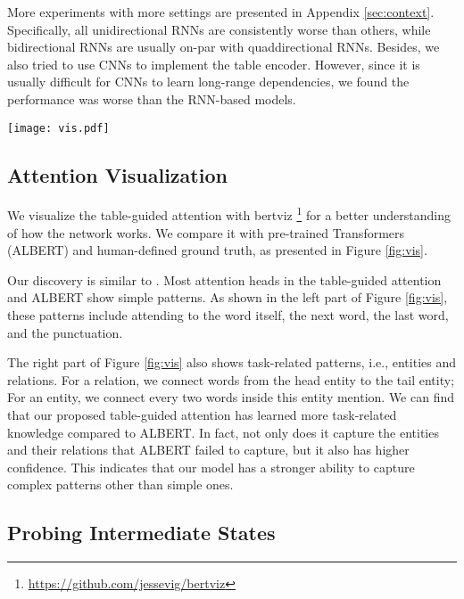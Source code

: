\documentclass[11pt,a4paper]{article}
\begin{document}
More experiments with more settings are presented in Appendix \ref{sec:context}.
Specifically, all unidirectional RNNs are consistently worse than others,
while bidirectional RNNs are usually on-par with quaddirectional RNNs.
Besides, we also tried to use CNNs to implement the table encoder.
However, since it is usually difficult for CNNs to learn long-range dependencies, we found the performance was worse than the RNN-based models.

\begin{figure*}
    \centering
    \texttt{[image: vis.pdf]}
    \caption{
        Comparison between ground truth and selected heads of ALBERT and table-guided attention.
        The sentence is randomly selected from the development set of ACE05.
    }
    \label{fig:vis}
\end{figure*}


\subsection{Attention Visualization} \label{sec:vis}

We visualize the table-guided attention with bertviz \cite{bertviz}\footnote{\url{https://github.com/jessevig/bertviz}} for a better understanding of how the network works.
We compare it with pre-trained Transformers (ALBERT) and human-defined ground truth, as presented in Figure \ref{fig:vis}.

Our discovery is similar to \citet{clark2019does}.
Most attention heads in the table-guided attention and ALBERT show simple patterns.
As shown in the left part of Figure \ref{fig:vis}, these patterns include attending to the word itself, the next word, the last word, and the punctuation.

The right part of Figure \ref{fig:vis} also shows task-related patterns, i.e., entities and relations.
For a relation, we connect words from the head entity to the tail entity;
For an entity, we connect every two words inside this entity mention.
We can find that our proposed table-guided attention has learned more task-related knowledge compared to ALBERT.
In fact, not only does it capture the entities and their relations that ALBERT failed to capture, but it also has higher confidence.
This indicates that our model has a stronger ability to capture complex patterns other than simple ones.

\subsection{Probing Intermediate States}
\end{document}
